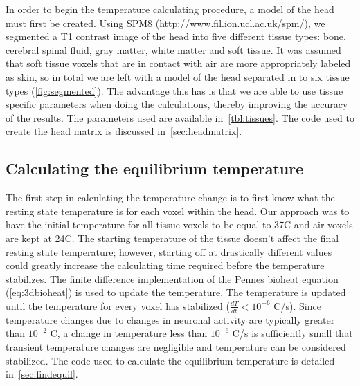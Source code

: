   In order to begin the temperature calculating procedure, a model of the head must first be created.  Using SPM8 (\url{http://www.fil.ion.ucl.ac.uk/spm/}), we segmented a T1 contrast image of the head into five different tissue types: bone, cerebral spinal fluid, gray matter, white matter and soft tissue.  It was assumed that soft tissue voxels that are in contact with air are more appropriately labeled as skin, so in total we are left with a model of the head separated in to six tissue types (\cref{fig:segmented}).  The advantage this has is that we are able to use tissue specific parameters when doing the calculations, thereby improving the accuracy of the results.  The parameters used are available in~\cref{tbl:tissues}.  The code used to create the head matrix is discussed in~\cref{sec:headmatrix}.

  
    \subsection{\label{sec:calcequilT} Calculating the equilibrium temperature}
  The first step in calculating the temperature change is to first know what the resting state temperature is for each voxel within the head. Our approach was to have the initial temperature for all tissue voxels to be equal to 37\degree C and air voxels are kept at 24\degree C.  The starting temperature of the tissue doesn't affect the final resting state temperature; however, starting off at drastically different values could greatly increase the calculating time required before the temperature stabilizes. The finite difference implementation of the Pennes bioheat equation (\cref{eq:3dbioheat}) is used to update the temperature.  The temperature is updated until the temperature for every voxel has stabilized ($\frac{dT}{dt} < 10^{-6}$ \degree C/s).  Since temperature changes due to changes in neuronal activity are typically greater than $10^{-2}$ \degree C, a change in temperature less than $10^{-6}$ \degree C/s is sufficiently small that transient temperature changes are negligible and temperature can be considered stabilized.  The code used to calculate the equilibrium temperature is detailed in~\cref{sec:findequil}.
  
